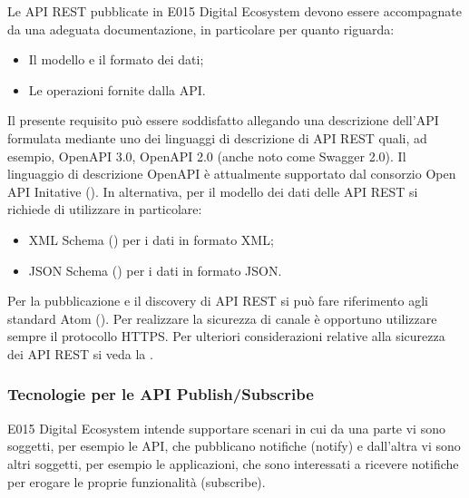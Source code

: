 \documentclass[letterpaper,10pt,italian]{sphinxmanual}
\begin{document}
Le API REST pubblicate in E015 Digital Ecosystem devono essere accompagnate da una adeguata documentazione, in particolare per quanto riguarda:
\begin{itemize}
\item {} 
Il modello e il formato dei dati;

\item {} 
Le operazioni fornite dalla API.

\end{itemize}

Il presente requisito può essere soddisfatto allegando una descrizione dell’API formulata mediante uno dei linguaggi di descrizione di API REST quali, ad esempio, OpenAPI 3.0, OpenAPI 2.0 (anche noto come Swagger 2.0). Il linguaggio di descrizione OpenAPI è attualmente supportato dal consorzio Open API Initative ().
In alternativa, per il modello dei dati delle API REST si richiede di utilizzare in particolare:
\begin{itemize}
\item {} 
XML Schema () per i dati in formato XML;

\item {} 
JSON Schema () per i dati in formato JSON.

\end{itemize}

Per la pubblicazione e il discovery di API REST si può fare riferimento agli standard Atom (). Per realizzare la sicurezza di canale è opportuno utilizzare sempre il protocollo HTTPS. Per ulteriori considerazioni relative alla sicurezza dei API REST si veda la {\hyperref[\detokenize{sez22:sezione2242}]{}}.


\subsubsection{Tecnologie per le API Publish/Subscribe}
\label{\detokenize{sez21:sezione2123}}\label{\detokenize{sez21:tecnologie-per-le-api-publish-subscribe}}
E015 Digital Ecosystem intende supportare scenari in cui da una parte vi sono soggetti, per esempio le API, che pubblicano notifiche (notify) e dall’altra vi sono altri soggetti, per esempio le applicazioni, che sono interessati a ricevere notifiche per erogare le proprie funzionalità (subscribe).
\end{document}
